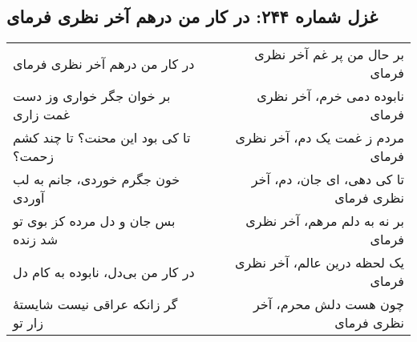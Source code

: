 \begin{center}
\section*{غزل شماره ۲۴۴: در کار من درهم آخر نظری فرمای}
\label{sec:244}
\begin{longtable}{l p{0.5cm} r}
در کار من درهم آخر نظری فرمای
&&
بر حال من پر غم آخر نظری فرمای
\\
بر خوان جگر خواری وز دست غمت زاری
&&
نابوده دمی خرم، آخر نظری فرمای
\\
تا کی بود این محنت؟ تا چند کشم زحمت؟
&&
مردم ز غمت یک دم، آخر نظری فرمای
\\
خون جگرم خوردی، جانم به لب آوردی
&&
تا کی دهی، ای جان، دم، آخر نظری فرمای
\\
بس جان و دل مرده کز بوی تو شد زنده
&&
بر نه به دلم مرهم، آخر نظری فرمای
\\
در کار من بی‌دل، نابوده به کام دل
&&
یک لحظه درین عالم، آخر نظری فرمای
\\
گر زانکه عراقی نیست شایستهٔ زار تو
&&
چون هست دلش محرم، آخر نظری فرمای
\\
\end{longtable}
\end{center}
